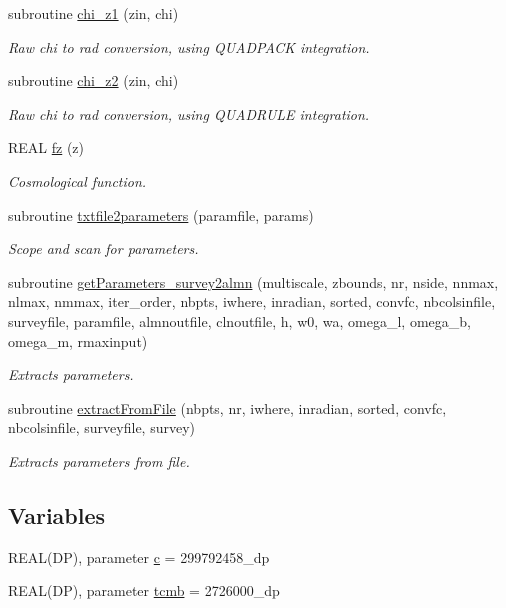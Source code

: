 \begin{DoxyCompactItemize}
subroutine \hyperlink{namespacef3dex__cosmotools_aae4fa92003adf2bfde48fa0dfcbf6b51}{chi\_\-z1} (zin, chi)
\begin{DoxyCompactList}\small\item\em Raw chi to rad conversion, using QUADPACK integration. \end{DoxyCompactList}\item 
subroutine \hyperlink{namespacef3dex__cosmotools_a6c29a874ae95da9fb207a2f63729eecf}{chi\_\-z2} (zin, chi)
\begin{DoxyCompactList}\small\item\em Raw chi to rad conversion, using QUADRULE integration. \end{DoxyCompactList}\item 
REAL \hyperlink{namespacef3dex__cosmotools_abba0e9b02d0f46a5abce5a0830da7f4d}{fz} (z)
\begin{DoxyCompactList}\small\item\em Cosmological function. \end{DoxyCompactList}\item 
subroutine \hyperlink{namespacef3dex__cosmotools_a609d3f29da9fc1be3bf27757e25532eb}{txtfile2parameters} (paramfile, params)
\begin{DoxyCompactList}\small\item\em Scope and scan for parameters. \end{DoxyCompactList}\item 
subroutine \hyperlink{namespacef3dex__cosmotools_a8405dbd12e86a408520f40f1b0a68919}{getParameters\_\-survey2almn} (multiscale, zbounds, nr, nside, nnmax, nlmax, nmmax, iter\_\-order, nbpts, iwhere, inradian, sorted, convfc, nbcolsinfile, surveyfile, paramfile, almnoutfile, clnoutfile, h, w0, wa, omega\_\-l, omega\_\-b, omega\_\-m, rmaxinput)
\begin{DoxyCompactList}\small\item\em Extracts parameters. \end{DoxyCompactList}\item 
subroutine \hyperlink{namespacef3dex__cosmotools_aaef3c07f112a83e6ff7a2762d5202fae}{extractFromFile} (nbpts, nr, iwhere, inradian, sorted, convfc, nbcolsinfile, surveyfile, survey)
\begin{DoxyCompactList}\small\item\em Extracts parameters from file. \end{DoxyCompactList}\end{DoxyCompactItemize}
\subsection*{Variables}
\begin{DoxyCompactItemize}
\item 
REAL(DP), parameter \hyperlink{namespacef3dex__cosmotools_a211d492263b2040371280021352d9154}{c} = 299792458\_\-dp
\item 
REAL(DP), parameter \hyperlink{namespacef3dex__cosmotools_a8953fe6dc399fcf889789bee9702ee65}{tcmb} = 2726000\_\-dp
\end{DoxyCompactItemize}



